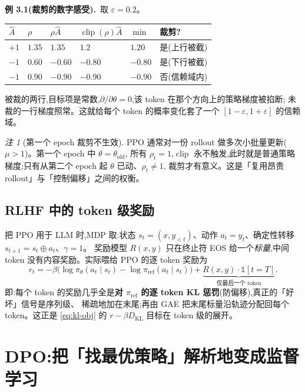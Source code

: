 \documentclass[11pt]{article}
\newcommand{\KL}{D_{\mathrm{KL}}}
\newcommand{\piref}{\pi_{\mathrm{ref}}}
\newcommand{\pith}{\pi_\theta}
\DeclareMathOperator{\clip}{clip}
\theoremstyle{plain}
\theoremstyle{definition}
\theoremstyle{remark}
\newtheorem{remark}[theorem]{注}
\begin{document}
\begin{exbox}
\textbf{例 3.1(裁剪的数字感受).}\ 取 $\varepsilon=0.2$。
\begin{center}\small
\begin{tabular}{@{}llllll@{}}
\toprule
$\hat A$ & $\rho$ & $\rho\hat A$ & $\clip(\rho)\hat A$ & $\min$ & 裁剪?\\
\midrule
$+1$ & $1.35$ & $1.35$ & $1.2$ & $1.20$ & 是(上行被截)\\
$-1$ & $0.60$ & $-0.60$ & $-0.80$ & $-0.80$ & 是(下行被截)\\
$-1$ & $0.90$ & $-0.90$ & $-0.90$ & $-0.90$ & 否(信赖域内)\\
\bottomrule
\end{tabular}
\end{center}
被裁的两行,目标项是常数,$\partial/\partial\theta=0$,该 token 在那个方向上的策略梯度被掐断;
未裁的一行梯度照常。这就给每个 token 的概率变化套了一个 $[1-\varepsilon,1+\varepsilon]$ 的信赖域。
\end{exbox}

\begin{remark}[第一个 epoch 裁剪不生效]
PPO 通常对一份 rollout 做多次小批量更新($\mu>1$)。第一个 epoch 中 $\theta=\theta_{\mathrm{old}}$,
所有 $\rho_t=1$,$\clip$ 永不触发,此时就是普通策略梯度;只有从第二个 epoch 起 $\theta$ 已动、$\rho_t\ne1$,
裁剪才有意义。这是「复用昂贵 rollout」与「控制偏移」之间的权衡。
\end{remark}

\subsection{RLHF 中的 token 级奖励}

把 PPO 用于 LLM 时,MDP 取:状态 $s_t=(x,y_{<t})$、动作 $a_t=y_t$、确定性转移 $s_{t+1}=s_t\oplus a_t$、$\gamma=1$。
奖励模型 $R(x,y)$ 只在终止符 EOS 给一个\emph{标量},中间 token 没有内容奖励。实际喂给 PPO 的逐 token 奖励为
\begin{equation}\label{eq:rlhf-reward}
r_t=-\beta\big(\log\pith(a_t\mid s_t)-\log\piref(a_t\mid s_t)\big)+\underbrace{R(x,y)\cdot\mathbb{1}[t=T]}_{\text{仅最后一个 token}}.
\end{equation}
即:每个 token 的奖励几乎全是\textbf{对 $\piref$ 的逐 token KL 惩罚}(防偏移),真正的「好坏」信号是序列级、
稀疏地加在末尾;再由 GAE 把末尾标量沿轨迹分配回每个 token。这正是 \eqref{eq:kl-obj} 的 $r-\beta\KL$ 目标在 token 级的展开。

\section{DPO:把「找最优策略」解析地变成监督学习}
\end{document}
